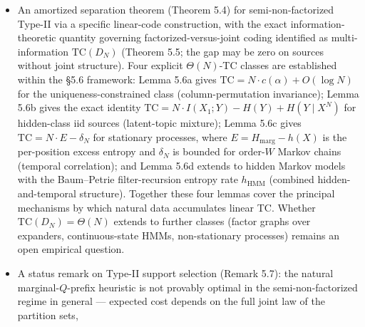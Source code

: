 \documentclass[
]{article}
\begin{document}
\begin{itemize}
  entropy-coded. The flat-enumerative candidate-set cost
  $\log_2 |\mathcal{C}(Y,\mathbf{k})|$ (the multinomial baseline only when
  no support is used) is a converse only for the uniform-index scheme; it
  equals $H(X \mid Y)$ exactly when the conditional law is uniform on the
  decoder-available candidate set (so Theorem 5.3 is entropy-optimal
  there) and otherwise exceeds it by the recoverable within-candidate-set
  uniform deficit (a KL divergence, with source-dependent support metadata
  charged). Three worked counterexamples ($N=4$, $\mathbf{k}=(1,3)$) show
  this overhead is the price of uniform indexing on the candidate set ---
  not of the partition representation, not measured against the full count
  class once a support is used, and not evadable by source-dependent
  support metadata (which is charged); it is thus not misattributed to
  Type-II as such.
\item
  An amortized separation theorem (Theorem 5.4) for
  semi-non-factorized Type-II via a specific linear-code
  construction, with the exact information-theoretic quantity
  governing factorized-versus-joint coding identified as
  multi-information $\mathrm{TC}(D_N)$ (Theorem 5.5; the gap may be
  zero on sources without joint structure). Four explicit
  $\Theta(N)$-TC classes are established within the §5.6 framework:
  Lemma 5.6a gives $\mathrm{TC} = N \cdot c(\alpha) + O(\log N)$ for
  the uniqueness-constrained class (column-permutation invariance);
  Lemma 5.6b gives the exact identity
  $\mathrm{TC} = N \cdot I(X_1; Y) - H(Y) + H(Y \mid X^N)$ for
  hidden-class iid sources (latent-topic mixture); Lemma 5.6c
  gives $\mathrm{TC} = N \cdot E - \delta_N$ for stationary
  processes, where $E = H_{\mathrm{marg}} - h(X)$ is the per-position
  excess entropy and $\delta_N$ is bounded for order-$W$ Markov
  chains (temporal correlation); and Lemma 5.6d extends to hidden
  Markov models with the Baum--Petrie filter-recursion entropy rate
  $h_{\mathrm{HMM}}$ (combined hidden-and-temporal structure).
  Together these four lemmas cover the principal mechanisms by which
  natural data accumulates linear TC. Whether $\mathrm{TC}(D_N) =
  \Theta(N)$ extends to further classes (factor graphs over
  expanders, continuous-state HMMs, non-stationary processes)
  remains an open empirical question.
\item
  A status remark on Type-II support selection
  (Remark 5.7): the natural marginal-$Q$-prefix heuristic is not
  provably optimal in the semi-non-factorized regime in general ---
  expected cost depends on the full joint law of the partition sets,

\end{itemize}
\end{document}
